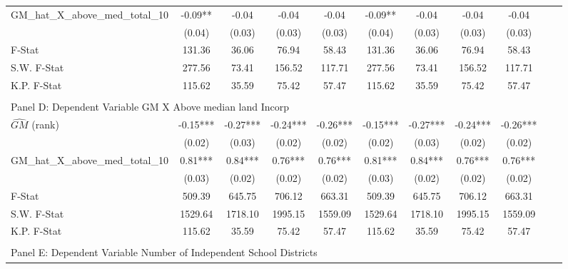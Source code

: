 \begin{table}[htbp]
\begin{threeparttable}
\begin{tabular}{l*{10}{c}}
\addlinespace
GM\_hat\_X\_above\_med\_total\_10&      -0.09** &      -0.04   &      -0.04   &      -0.04   &      -0.09** &      -0.04   &      -0.04   &      -0.04   \\
                &     (0.04)   &     (0.03)   &     (0.03)   &     (0.03)   &     (0.04)   &     (0.03)   &     (0.03)   &     (0.03)   \\
\midrule
F-Stat          &     131.36   &      36.06   &      76.94   &      58.43   &     131.36   &      36.06   &      76.94   &      58.43   \\
S.W. F-Stat     &     277.56   &      73.41   &     156.52   &     117.71   &     277.56   &      73.41   &     156.52   &     117.71   \\
K.P. F-Stat     &     115.62   &      35.59   &      75.42   &      57.47   &     115.62   &      35.59   &      75.42   &      57.47   \\
\cmidrule[\heavyrulewidth](lr){1-9} \\ \cmidrule[\heavyrulewidth](lr){1-9}
\multicolumn{8}{l}{Panel D: Dependent Variable GM X Above median land Incorp}\\
\cmidrule(lr){1-9}
$\hat{GM}$ (rank)&      -0.15***&      -0.27***&      -0.24***&      -0.26***&      -0.15***&      -0.27***&      -0.24***&      -0.26***\\
                &     (0.02)   &     (0.03)   &     (0.02)   &     (0.02)   &     (0.02)   &     (0.03)   &     (0.02)   &     (0.02)   \\
\addlinespace
GM\_hat\_X\_above\_med\_total\_10&       0.81***&       0.84***&       0.76***&       0.76***&       0.81***&       0.84***&       0.76***&       0.76***\\
                &     (0.03)   &     (0.02)   &     (0.02)   &     (0.02)   &     (0.03)   &     (0.02)   &     (0.02)   &     (0.02)   \\
\midrule
F-Stat          &     509.39   &     645.75   &     706.12   &     663.31   &     509.39   &     645.75   &     706.12   &     663.31   \\
S.W. F-Stat     &    1529.64   &    1718.10   &    1995.15   &    1559.09   &    1529.64   &    1718.10   &    1995.15   &    1559.09   \\
K.P. F-Stat     &     115.62   &      35.59   &      75.42   &      57.47   &     115.62   &      35.59   &      75.42   &      57.47   \\
\cmidrule[\heavyrulewidth](lr){1-9} \\ \cmidrule[\heavyrulewidth](lr){1-9}
\multicolumn{8}{l}{Panel E: Dependent Variable Number of Independent School Districts}\\

\end{tabular}
\end{threeparttable}
\end{table}
